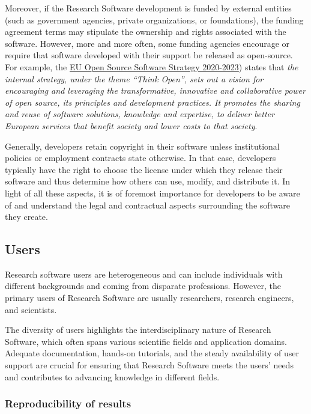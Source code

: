 Moreover, if the Research Software development is funded by external entities (such as government agencies, private organizations, or foundations), the funding agreement terms may stipulate the ownership and rights associated with the software. However, more and more often, some funding agencies encourage or require that software developed with their support be released as open-source. For example, the \href{https://commission.europa.eu/about-european-commission/departments-and-executive-agencies/digital-services/open-source-software-strategy_en}{EU Open Source Software Strategy 2020-2023}) states that \textit{the internal strategy, under the theme ``Think Open'', sets out a vision for encouraging and leveraging the transformative, innovative and collaborative power of open source, its principles and development practices. It promotes the sharing and reuse of software solutions, knowledge and expertise, to deliver better European services that benefit society and lower costs to that society}.

Generally, developers retain copyright in their software unless institutional policies or employment contracts state otherwise. In that case, developers typically have the right to choose the license under which they release their software and thus determine how others can use, modify, and distribute it. In light of all these aspects, it is of foremost importance for developers to be aware of and understand the legal and contractual aspects surrounding the software they create.


\subsection{Users}

Research software users are heterogeneous and can include individuals with different backgrounds and coming from disparate professions. However, the primary users of Research Software are usually researchers, research engineers, and scientists.

The diversity of users highlights the interdisciplinary nature of Research Software, which often spans various scientific fields and application domains. Adequate documentation, hands-on tutorials, and the steady availability of user support are crucial for ensuring that Research Software meets the users' needs and contributes to advancing knowledge in different fields.

\subsubsection*{Reproducibility of results}
\label{sec:user_repro_results}

